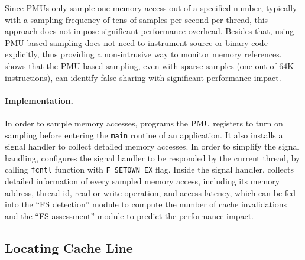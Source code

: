 Since PMUs only sample one memory access out of a specified number, typically with a sampling frequency of tens of samples per second per thread, this approach does not impose significant performance overhead. Besides that, using PMU-based sampling does not need to instrument source or binary code explicitly, thus providing a non-intrusive way to monitor memory references. \cheetah{} shows that the PMU-based sampling, even with sparse samples (one out of 64K instructions), can identify false sharing with significant performance impact.
 

\paragraph{Implementation.} 

In order to sample memory accesses, \cheetah{} programs the PMU registers to turn on sampling before entering the \texttt{main} routine of an application. It also installs a signal handler to collect detailed memory accesses. In order to simplify the signal handling, \Cheetah{} configures the signal handler to be responded by the current thread, by calling \texttt{fcntl} function with \texttt{F\_SETOWN\_EX} flag. Inside the signal handler, \Cheetah{} collects detailed information of every sampled memory access, including its memory address, thread id, read or write operation, and access latency, which can be fed into the ``FS detection'' module to compute the number of cache invalidations and the ``FS assessment'' module to predict the performance impact.

\subsection{Locating Cache Line}
\label{sec:shadow}

